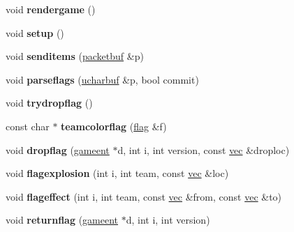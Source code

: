 \begin{DoxyCompactItemize}
void {\bfseries rendergame} ()
\item 
\mbox{\label{structctfclientmode_ae9367ed754802c93ce502fd4cf3b4e2a}} 
void {\bfseries setup} ()
\item 
\mbox{\label{structctfclientmode_a19a19ed32f239bbd2097f27868253afd}} 
void {\bfseries senditems} (\hyperlink{structpacketbuf}{packetbuf} \&p)
\item 
\mbox{\label{structctfclientmode_ab38e92cb8bf9e7c3c78839d7e786d2ba}} 
void {\bfseries parseflags} (\hyperlink{structdatabuf}{ucharbuf} \&p, bool commit)
\item 
\mbox{\label{structctfclientmode_a8455a8614fbfc82bbca9384f5b1df33d}} 
void {\bfseries trydropflag} ()
\item 
\mbox{\label{structctfclientmode_a2cad6d40249a404d53ce9b823da31ba4}} 
const char $\ast$ {\bfseries teamcolorflag} (\hyperlink{structctfclientmode_1_1flag}{flag} \&f)
\item 
\mbox{\label{structctfclientmode_a1304cfab3df92b338d2fa1d0913b024b}} 
void {\bfseries dropflag} (\hyperlink{structgameent}{gameent} $\ast$d, int i, int version, const \hyperlink{structvec}{vec} \&droploc)
\item 
\mbox{\label{structctfclientmode_a6f1bbf4c63bf6e8b6c7859a489737ff3}} 
void {\bfseries flagexplosion} (int i, int team, const \hyperlink{structvec}{vec} \&loc)
\item 
\mbox{\label{structctfclientmode_a3037b6ebbaf617856d3885b07a28c556}} 
void {\bfseries flageffect} (int i, int team, const \hyperlink{structvec}{vec} \&from, const \hyperlink{structvec}{vec} \&to)
\item 
\mbox{\label{structctfclientmode_a564fea7dd03377b5b71a80c4405c9906}} 
void {\bfseries returnflag} (\hyperlink{structgameent}{gameent} $\ast$d, int i, int version)
\item 
\mbox{\label{structctfclientmode_a96f10b771db1011a9859933e5769acf7}} 

\end{DoxyCompactItemize}
